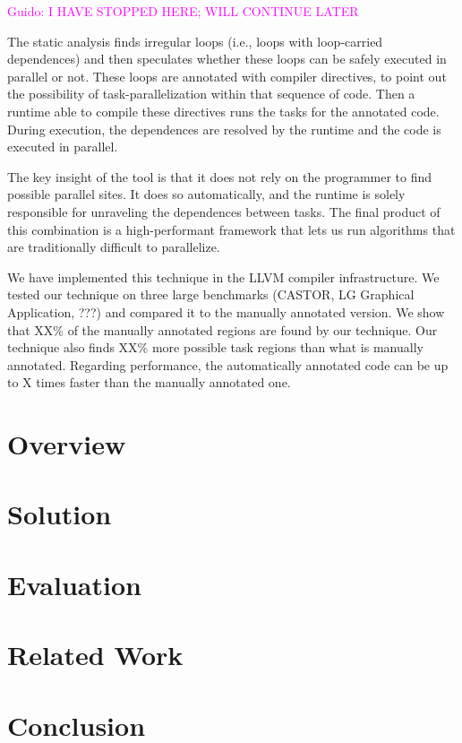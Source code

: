 \documentclass[pageno]{jpaper}
\newcommand{\guido}[1]{\noindent\textcolor{magenta}{Guido: {#1}}}
\newcommand{\guido}[1]{}
\begin{document}
\guido{I HAVE STOPPED HERE; WILL CONTINUE LATER}

The static analysis finds irregular loops (i.e., loops with loop-carried dependences) and then speculates 
whether these loops can be safely executed in parallel or not. These loops
are annotated with compiler directives, to point out the possibility of task-parallelization within that sequence of code. 
Then a runtime able to compile these directives runs the tasks for the annotated code. 
During execution, the dependences are resolved by the runtime and the code is executed in parallel. 

The key insight of the tool is that it does not rely on the programmer to find possible parallel sites. 
It does so automatically, and the runtime is solely responsible for unraveling the dependences between tasks. 
The final product of this combination is a high-performant framework that
lets us run algorithms that are traditionally difficult to parallelize.

We have implemented this technique in the LLVM compiler infrastructure. We tested our technique on three large benchmarks (CASTOR, LG Graphical Application, ???) and compared it to the manually annotated version. We show that XX\% of the manually annotated regions are found by our technique. Our technique also finds XX\% more possible task regions than what is manually annotated. Regarding performance, the automatically annotated code can be up to X times faster than the manually annotated one.






\section{Overview}
\label{sec:ovf}

\section{Solution}
\label{sec:sol}

\section{Evaluation}
\label{sec:eval}

\section{Related Work}
\label{sec:rw}

\section{Conclusion}
\label{sec:conc}



\end{document}
